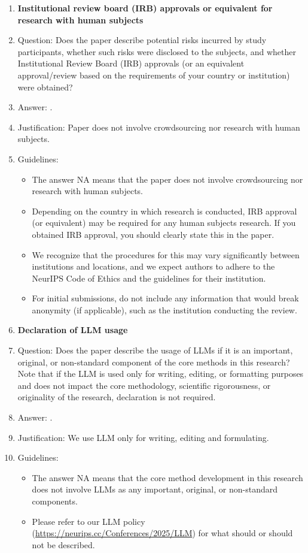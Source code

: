 \documentclass{article}
\begin{document}
{\begin{enumerate}
\item {\bf Institutional review board (IRB) approvals or equivalent for research with human subjects}
    \item[] Question: Does the paper describe potential risks incurred by study participants, whether such risks were disclosed to the subjects, and whether Institutional Review Board (IRB) approvals (or an equivalent approval/review based on the requirements of your country or institution) were obtained?
    \item[] Answer: \answerNA{}.
    \item[] Justification: Paper does not involve crowdsourcing nor research with human subjects.
    \item[] Guidelines:
    \begin{itemize}
        \item The answer NA means that the paper does not involve crowdsourcing nor research with human subjects.
        \item Depending on the country in which research is conducted, IRB approval (or equivalent) may be required for any human subjects research. If you obtained IRB approval, you should clearly state this in the paper. 
        \item We recognize that the procedures for this may vary significantly between institutions and locations, and we expect authors to adhere to the NeurIPS Code of Ethics and the guidelines for their institution. 
        \item For initial submissions, do not include any information that would break anonymity (if applicable), such as the institution conducting the review.
    \end{itemize}

\item {\bf Declaration of LLM usage}
    \item[] Question: Does the paper describe the usage of LLMs if it is an important, original, or non-standard component of the core methods in this research? Note that if the LLM is used only for writing, editing, or formatting purposes and does not impact the core methodology, scientific rigorousness, or originality of the research, declaration is not required.
    \item[] Answer: \answerNA{}.
    \item[] Justification: We use LLM only for writing, editing and formulating.
    \item[] Guidelines:
    \begin{itemize}
        \item The answer NA means that the core method development in this research does not involve LLMs as any important, original, or non-standard components.
        \item Please refer to our LLM policy (\url{https://neurips.cc/Conferences/2025/LLM}) for what should or should not be described.
    \end{itemize}

\end{enumerate}}
\end{document}

